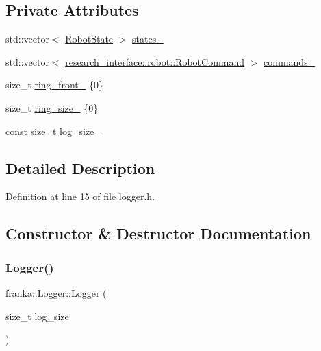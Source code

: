 \subsection*{Private Attributes}
\begin{DoxyCompactItemize}
\item 
std\+::vector$<$ \hyperlink{structfranka_1_1RobotState}{Robot\+State} $>$ \hyperlink{classfranka_1_1Logger_aea60d37797979d786e7653168cf49ecb}{states\+\_\+}
\item 
std\+::vector$<$ \hyperlink{structresearch__interface_1_1robot_1_1RobotCommand}{research\+\_\+interface\+::robot\+::\+Robot\+Command} $>$ \hyperlink{classfranka_1_1Logger_acbc69d24663395732ac72d274146eb5f}{commands\+\_\+}
\item 
size\+\_\+t \hyperlink{classfranka_1_1Logger_ac8b62b201f384202b095b68babe0a8da}{ring\+\_\+front\+\_\+} \{0\}
\item 
size\+\_\+t \hyperlink{classfranka_1_1Logger_ab70ce51d314081d2f467a6dfbf1f80a4}{ring\+\_\+size\+\_\+} \{0\}
\item 
const size\+\_\+t \hyperlink{classfranka_1_1Logger_ac4d8294e724b3e1ada3ddbcdfc14e245}{log\+\_\+size\+\_\+}
\end{DoxyCompactItemize}


\subsection{Detailed Description}


Definition at line 15 of file logger.\+h.



\subsection{Constructor \& Destructor Documentation}
\mbox{\label{classfranka_1_1Logger_acc350f37e055aad0d47c7a90695354d2}} 
\subsubsection{\texorpdfstring{Logger()}{Logger()}}
{\footnotesize\ttfamily franka\+::\+Logger\+::\+Logger (\begin{DoxyParamCaption}\item[{size\+\_\+t}]{log\+\_\+size }\end{DoxyParamCaption})\hspace{0.3cm}{\ttfamily [explicit]}}



